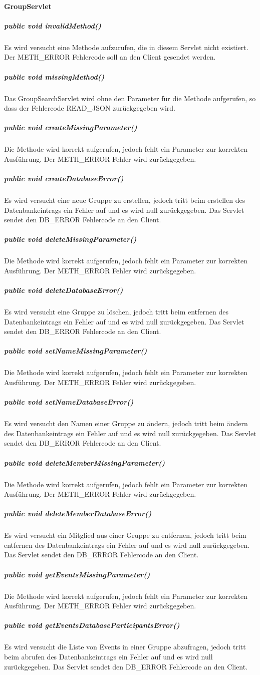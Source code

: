\documentclass{scrartcl}
\begin{document}
\paragraph{GroupServlet}
\subparagraph{public void invalidMethod()}
Es wird versucht eine Methode aufzurufen, die in diesem Servlet nicht existiert. Der METH\_ERROR Fehlercode soll an den Client gesendet werden.
\subparagraph{public void missingMethod()}
Das GroupSearchServlet wird ohne den Parameter für die Methode aufgerufen, so dass der Fehlercode READ\_JSON zurückgegeben wird.
\subparagraph{public void createMissingParameter()}
Die Methode wird korrekt aufgerufen, jedoch fehlt ein Parameter zur korrekten Ausführung. Der METH\_ERROR Fehler wird zurückgegeben.
\subparagraph{public void createDatabaseError()}
Es wird versucht eine neue Gruppe zu erstellen, jedoch tritt beim erstellen des Datenbankeintrags ein Fehler auf und es wird null zurückgegeben. Das Servlet sendet den DB\_ERROR Fehlercode an den Client.
\subparagraph{public void deleteMissingParameter()}
Die Methode wird korrekt aufgerufen, jedoch fehlt ein Parameter zur korrekten Ausführung. Der METH\_ERROR Fehler wird zurückgegeben.
\subparagraph{public void deleteDatabaseError()}
Es wird versucht eine Gruppe zu löschen, jedoch tritt beim entfernen des Datenbankeintrags ein Fehler auf und es wird null zurückgegeben. Das Servlet sendet den DB\_ERROR Fehlercode an den Client.
\subparagraph{public void setNameMissingParameter()}
Die Methode wird korrekt aufgerufen, jedoch fehlt ein Parameter zur korrekten Ausführung. Der METH\_ERROR Fehler wird zurückgegeben.
\subparagraph{public void setNameDatabaseError()}
Es wird versucht den Namen einer Gruppe zu ändern, jedoch tritt beim ändern des Datenbankeintrags ein Fehler auf und es wird null zurückgegeben. Das Servlet sendet den DB\_ERROR Fehlercode an den Client.
\subparagraph{public void deleteMemberMissingParameter()}
Die Methode wird korrekt aufgerufen, jedoch fehlt ein Parameter zur korrekten Ausführung. Der METH\_ERROR Fehler wird zurückgegeben.
\subparagraph{public void deleteMemberDatabaseError()}
Es wird versucht ein Mitglied aus einer Gruppe zu entfernen, jedoch tritt beim entfernen des Datenbankeintrags ein Fehler auf und es wird null zurückgegeben. Das Servlet sendet den DB\_ERROR Fehlercode an den Client.
\subparagraph{public void getEventsMissingParameter()}
Die Methode wird korrekt aufgerufen, jedoch fehlt ein Parameter zur korrekten Ausführung. Der METH\_ERROR Fehler wird zurückgegeben.
\subparagraph{public void getEventsDatabaseParticipantsError()}
Es wird versucht die Liste von Events in einer Gruppe abzufragen, jedoch tritt beim abrufen des Datenbankeintrags ein Fehler auf und es wird null zurückgegeben. Das Servlet sendet den DB\_ERROR Fehlercode an den Client.
\end{document}
